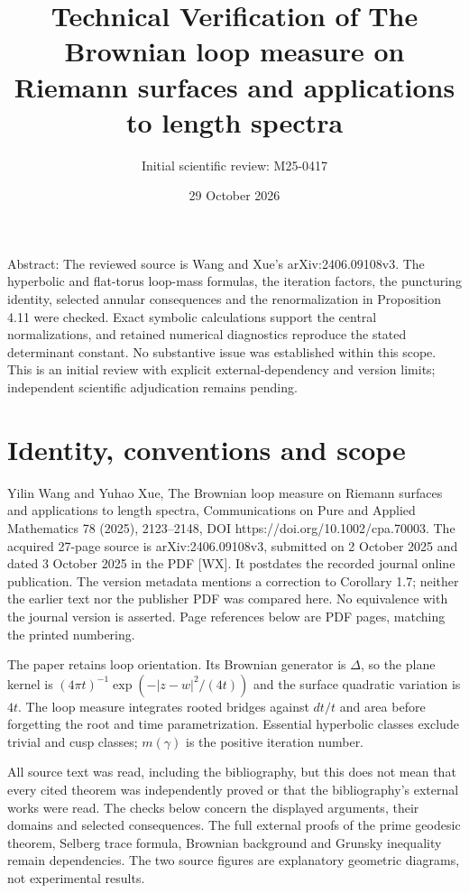 \documentclass[10pt]{article}
\title{Technical Verification of
The Brownian loop measure on Riemann surfaces and applications to length spectra}
\author{Initial scientific review: M25-0417}
\date{29 October 2026}
\begin{document}
\maketitle
Abstract: The reviewed source is Wang and Xue’s arXiv:2406.09108v3. The hyperbolic and flat-torus loop-mass formulas, the iteration factors, the puncturing identity, selected annular consequences and the renormalization in Proposition 4.11 were checked. Exact symbolic calculations support the central normalizations, and retained numerical diagnostics reproduce the stated determinant constant. No substantive issue was established within this scope. This is an initial review with explicit external-dependency and version limits; independent scientific adjudication remains pending.\par
\section*{Identity, conventions and scope}
Yilin Wang and Yuhao Xue, The Brownian loop measure on Riemann surfaces and applications to length spectra, Communications on Pure and Applied Mathematics 78 (2025), 2123–2148, DOI https://doi.org/10.1002/cpa.70003. The acquired 27-page source is arXiv:2406.09108v3, submitted on 2 October 2025 and dated 3 October 2025 in the PDF [WX]. It postdates the recorded journal online publication. The version metadata mentions a correction to Corollary 1.7; neither the earlier text nor the publisher PDF was compared here. No equivalence with the journal version is asserted. Page references below are PDF pages, matching the printed numbering.\par
The paper retains loop orientation. Its Brownian generator is \(\Delta\), so the plane kernel is \((4\pi t)^{-1}\exp(-|z-w|^2/(4t))\) and the surface quadratic variation is \(4t\). The loop measure integrates rooted bridges against \(dt/t\) and area before forgetting the root and time parametrization. Essential hyperbolic classes exclude trivial and cusp classes; \(m(\gamma)\) is the positive iteration number.\par
All source text was read, including the bibliography, but this does not mean that every cited theorem was independently proved or that the bibliography’s external works were read. The checks below concern the displayed arguments, their domains and selected consequences. The full external proofs of the prime geodesic theorem, Selberg trace formula, Brownian background and Grunsky inequality remain dependencies. The two source figures are explanatory geometric diagrams, not experimental results.\par
\end{document}
